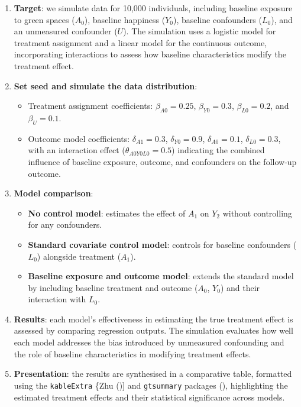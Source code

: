 \documentclass[
  singlecolumn]{article}
\providecommand{\tightlist}{%
  \setlength{\itemsep}{0pt}\setlength{\parskip}{0pt}}\usepackage{longtable,booktabs,array}
\begin{document}
\begin{enumerate}
\def\labelenumi{\arabic{enumi}.}
\item
  \textbf{Target}: we simulate data for 10,000 individuals, including
  baseline exposure to green spaces (\(A_0\)), baseline happiness
  (\(Y_0\)), baseline confounders (\(L_0\)), and an unmeasured
  confounder (\(U\)). The simulation uses a logistic model for treatment
  assignment and a linear model for the continuous outcome,
  incorporating interactions to assess how baseline characteristics
  modify the treatment effect.
\item
  \textbf{Set seed and simulate the data distribution}:

  \begin{itemize}
  \tightlist
  \item
    Treatment assignment coefficients: \(\beta_{A0} = 0.25\),
    \(\beta_{Y0} = 0.3\), \(\beta_{L0} = 0.2\), and \(\beta_{U} = 0.1\).
  \item
    Outcome model coefficients: \(\delta_{A1} = 0.3\),
    \(\delta_{Y0} = 0.9\), \(\delta_{A0} = 0.1\), \(\delta_{L0} = 0.3\),
    with an interaction effect (\(\theta_{A0Y0L0} = 0.5\)) indicating
    the combined influence of baseline exposure, outcome, and
    confounders on the follow-up outcome.
  \end{itemize}
\item
  \textbf{Model comparison}:

  \begin{itemize}
  \tightlist
  \item
    \textbf{No control model}: estimates the effect of \(A_1\) on
    \(Y_2\) without controlling for any confounders.
  \item
    \textbf{Standard covariate control model}: controls for baseline
    confounders (\(L_0\)) alongside treatment (\(A_1\)).
  \item
    \textbf{Baseline exposure and outcome model}: extends the standard
    model by including baseline treatment and outcome (\(A_0\), \(Y_0\))
    and their interaction with \(L_0\).
  \end{itemize}
\item
  \textbf{Results}: each model's effectiveness in estimating the true
  treatment effect is assessed by comparing regression outputs. The
  simulation evaluates how well each model addresses the bias introduced
  by unmeasured confounding and the role of baseline characteristics in
  modifying treatment effects.
\item
  \textbf{Presentation}: the results are synthesised in a comparative
  table, formatted using the \texttt{kableExtra} \{Zhu
  (){]} and \texttt{gtsummary}
  packages (),
  highlighting the estimated treatment effects and their statistical
  significance across models.
\end{enumerate}
\end{document}
